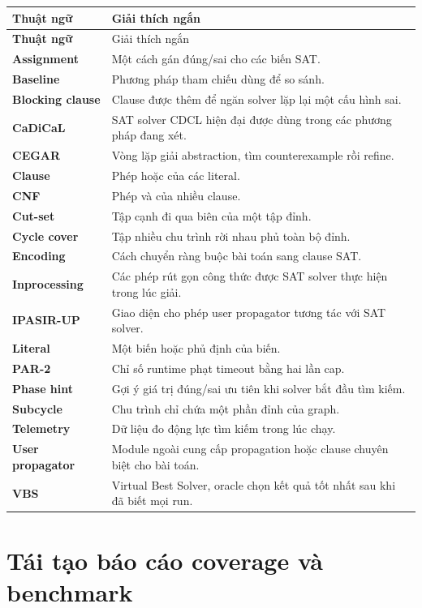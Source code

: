 \documentclass[11pt,a4paper,oneside]{scrreprt}
\begin{document}
\begin{longtable}{>{\raggedright\arraybackslash\bfseries\sffamily}p{34mm} >{\raggedright\arraybackslash}p{116mm}}
\toprule
Thuật ngữ & Giải thích ngắn \\
\midrule
\endfirsthead
\toprule
Thuật ngữ & Giải thích ngắn \\
\midrule
\endhead
Assignment & Một cách gán đúng/sai cho các biến SAT. \\
Baseline & Phương pháp tham chiếu dùng để so sánh. \\
Blocking clause & Clause được thêm để ngăn solver lặp lại một cấu hình sai. \\
CaDiCaL & SAT solver CDCL hiện đại được dùng trong các phương pháp đang xét. \\
CEGAR & Vòng lặp giải abstraction, tìm counterexample rồi refine. \\
Clause & Phép hoặc của các literal. \\
CNF & Phép và của nhiều clause. \\
Cut-set & Tập cạnh đi qua biên của một tập đỉnh. \\
Cycle cover & Tập nhiều chu trình rời nhau phủ toàn bộ đỉnh. \\
Encoding & Cách chuyển ràng buộc bài toán sang clause SAT. \\
Inprocessing & Các phép rút gọn công thức được SAT solver thực hiện trong lúc giải. \\
IPASIR-UP & Giao diện cho phép user propagator tương tác với SAT solver. \\
Literal & Một biến hoặc phủ định của biến. \\
PAR-2 & Chỉ số runtime phạt timeout bằng hai lần cap. \\
Phase hint & Gợi ý giá trị đúng/sai ưu tiên khi solver bắt đầu tìm kiếm. \\
Subcycle & Chu trình chỉ chứa một phần đỉnh của graph. \\
Telemetry & Dữ liệu đo động lực tìm kiếm trong lúc chạy. \\
User propagator & Module ngoài cung cấp propagation hoặc clause chuyên biệt cho bài toán. \\
VBS & Virtual Best Solver, oracle chọn kết quả tốt nhất sau khi đã biết mọi run. \\
\bottomrule
\end{longtable}

\chapter{Tái tạo báo cáo coverage và benchmark}
\end{document}
